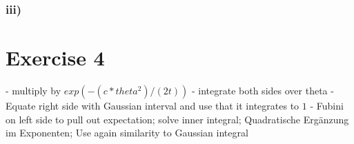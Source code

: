 \documentclass[10pt,a4paper]{article}
\begin{document}
\subsubsection*{iii)}

\section*{Exercise 4}

- multiply by $exp(-(c * theta^2) / (2t))$
- integrate both sides over theta
- Equate right side with Gaussian interval and use that it integrates to $1$
- Fubini on left side to pull out expectation; solve inner integral; Quadratische Ergänzung im Exponenten; Use again similarity to Gaussian integral
\end{document}
